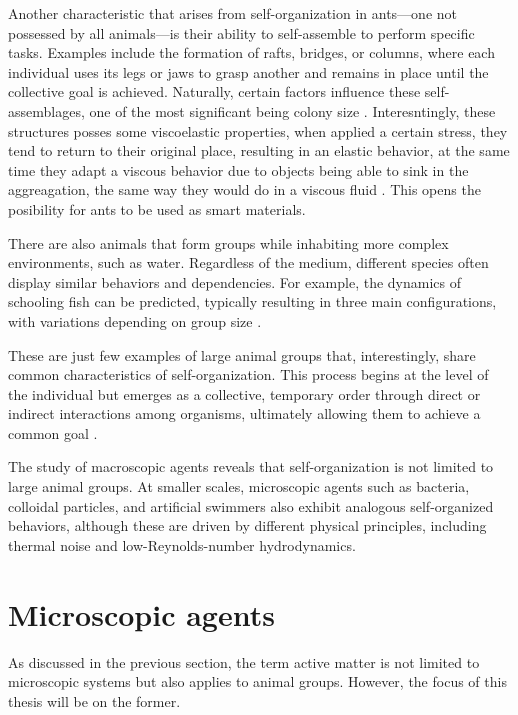 Another characteristic that arises from self-organization in ants—one not possessed by all animals—is their ability to self-assemble to perform specific tasks. Examples include the formation of rafts, bridges, or columns, where each individual uses its legs or jaws to grasp another and remains in place until the collective goal is achieved. Naturally, certain factors influence these self-assemblages, one of the most significant being colony size \cite{anderson2002self}. Interesntingly, these structures posses some viscoelastic properties, when applied a certain stress, they tend to return to their original place, resulting in an elastic behavior, at the same time they adapt a viscous behavior due to objects being able to sink in the aggreagation, the same way they would do in a viscous fluid \cite{tennenbaum2016mechanics}. This opens the posibility for ants to be used as smart materials. 

There are also animals that form groups while inhabiting more complex environments, such as water. Regardless of the medium, different species often display similar behaviors and dependencies. For example, the dynamics of schooling fish can be predicted, typically resulting in three main configurations, with variations depending on group size \cite{tunstrom2013collective, katz2011inferring, huang2024collective}.

These are just few examples of large animal groups that, interestingly, share common characteristics of self-organization. This process begins at the level of the individual but emerges as a collective, temporary order through direct or indirect interactions among organisms, ultimately allowing them to achieve a common goal \cite{isaeva2012self}.

The study of macroscopic agents reveals that self-organization is not limited to large animal groups. At smaller scales, microscopic agents such as bacteria, colloidal particles, and artificial swimmers also exhibit analogous self-organized behaviors, although these are driven by different physical principles, including thermal noise and low-Reynolds-number hydrodynamics.

\section{Microscopic agents}
As discussed in the previous section, the term active matter is not limited to microscopic systems but also applies to animal groups. However, the focus of this thesis will be on the former.

